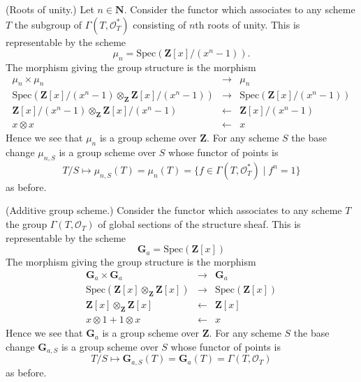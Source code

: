 \begin{example}
\label{example-roots-of-unity}
(Roots of unity.)
Let $n \in \mathbf{N}$.
Consider the functor which associates
to any scheme $T$ the subgroup of $\Gamma(T, \mathcal{O}_T^*)$
consisting of $n$th roots of unity.
This is representable by the scheme
$$
\mu_n = \text{Spec}(\mathbf{Z}[x]/(x^n - 1)).
$$
The morphism giving the group structure is the morphism
\begin{eqnarray*}
\mu_n \times \mu_n & \to & \mu_n \\
\text{Spec}(
\mathbf{Z}[x]/(x^n - 1)
\otimes_{\mathbf{Z}}
\mathbf{Z}[x]/(x^n - 1))
& \to &
\text{Spec}(\mathbf{Z}[x]/(x^n - 1)) \\
\mathbf{Z}[x]/(x^n - 1) \otimes_{\mathbf{Z}} \mathbf{Z}[x]/(x^n - 1)
& \leftarrow &
\mathbf{Z}[x]/(x^n - 1) \\
x \otimes x & \leftarrow & x
\end{eqnarray*}
Hence we see that $\mu_n$ is a group scheme over $\mathbf{Z}$.
For any scheme $S$ the base change $\mu_{n, S}$ is a
group scheme over $S$ whose functor of points is
$$
T/S
\longmapsto
\mu_{n, S}(T) = \mu_n(T) = \{f \in \Gamma(T, \mathcal{O}_T^*) \mid f^n = 1\}
$$
as before.
\end{example}


\begin{example}
\label{example-additive-group}
(Additive group scheme.)
Consider the functor which associates
to any scheme $T$ the group $\Gamma(T, \mathcal{O}_T)$
of global sections of the structure sheaf.
This is representable by the scheme
$$
\mathbf{G}_a = \text{Spec}(\mathbf{Z}[x])
$$
The morphism giving the group structure is the morphism
\begin{eqnarray*}
\mathbf{G}_a \times \mathbf{G}_a & \to & \mathbf{G}_a \\
\text{Spec}(\mathbf{Z}[x] \otimes_{\mathbf{Z}} \mathbf{Z}[x])
& \to &
\text{Spec}(\mathbf{Z}[x]) \\
\mathbf{Z}[x] \otimes_{\mathbf{Z}} \mathbf{Z}[x]
& \leftarrow &
\mathbf{Z}[x] \\
x \otimes 1 + 1 \otimes x & \leftarrow & x
\end{eqnarray*}
Hence we see that $\mathbf{G}_a$ is a group scheme over $\mathbf{Z}$.
For any scheme $S$ the base change $\mathbf{G}_{a, S}$ is a
group scheme over $S$ whose functor of points is
$$
T/S
\longmapsto
\mathbf{G}_{a, S}(T) = \mathbf{G}_a(T) = \Gamma(T, \mathcal{O}_T)
$$
as before.
\end{example}

